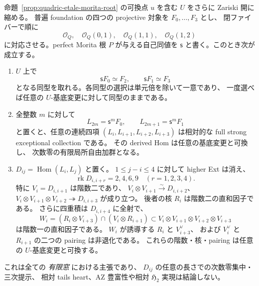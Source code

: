 \begin{proposition}
\label{prop:quadric-etale-finite-window}
命題~\ref{prop:quadric-etale-morita-root} の可換点 $u$ を含む
$U$ をさらに Zariski 開に縮める。
普遍 foundation の四つの projective 対象を $F_0,\ldots,F_3$ とし、
閉ファイバーで順に
\[
 \mathcal O_Q,\quad \mathcal O_Q(0,1),\quad
 \mathcal O_Q(1,1),\quad \mathcal O_Q(1,2)
\]
に対応させる。perfect Morita 根 $P$ が与える自己同値を
$\mathsf s$ と書く。このとき次が成立する。
\begin{enumerate}
\item $U$ 上で
  \[
     \mathsf sF_0\simeq F_2,\qquad
     \mathsf sF_1\simeq F_3
  \]
  となる同型を取れる。各同型の選択は単元倍を除いて一意であり、
  一度選べば任意の $U$-基底変更に対して同型のままである。
\item 全整数 $m$ に対して
  \[
    L_{2m}=\mathsf s^m F_0,\qquad
    L_{2m+1}=\mathsf s^m F_1
  \]
  と置くと、任意の連続四項 $(L_i,L_{i+1},L_{i+2},L_{i+3})$
  は相対的な full strong exceptional collection である。
  その derived Hom は任意の基底変更と可換し、
  次数零の有限局所自由加群となる。
\item $D_{ij}=\operatorname{Hom}(L_i,L_j)$ と置く。
  $1\leq j-i\leq4$ に対して higher Ext は消え、
  \[
    \operatorname{rk}D_{i,i+r}=2,4,6,9
       \quad(r=1,2,3,4).
  \]
  特に $V_i=D_{i,i+1}$ は階数二であり、
  $V_i\otimes V_{i+1}\xrightarrow{\sim}D_{i,i+2}$、
  $V_i\otimes V_{i+1}\otimes V_{i+2}\twoheadrightarrow
     D_{i,i+3}$ が成り立つ。
  後者の核 $R_i$ は階数二の直和因子である。
  さらに四重積は $D_{i,i+4}$ に全射で、
  \[
    W_i=(R_i\otimes V_{i+3})\cap
              (V_i\otimes R_{i+1})
       \subset V_i\otimes V_{i+1}\otimes V_{i+2}\otimes V_{i+3}
  \]
  は階数一の直和因子である。
  $W_i$ が誘導する $R_i$ と $V_{i+3}^{\vee}$、
  および $V_i^{\vee}$ と $R_{i+1}$ の二つの pairing は非退化である。
  これらの階数・核・pairing は任意の $U$-基底変更と可換する。
\end{enumerate}
これは全ての \emph{有限窓} における主張であり、
$D_{ij}$ の任意の長さでの次数零集中・三次提示、
相対 tails heart、AZ 豊富性や相対 $\mathfrak H_2$ 実現は結論しない。
\end{proposition}
